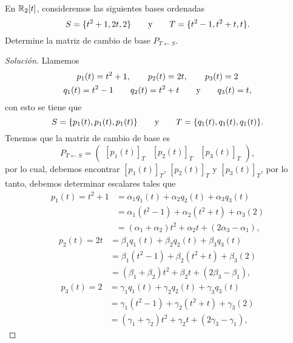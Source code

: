 \documentclass[a4,11pt]{aleph-notas}
\begin{document}
\begin{ejer}
    En $\mathbb{R}_2[t]$, consideremos las siguientes bases ordenadas
    \[
        S = \{t^2+1,2t,2\}
        \qquad\text{y}\qquad
        T = \{t^2-1,t^2+t,t\}.
    \]
    Determine la matriz de cambio de base $P_{T \leftarrow S}$.
\end{ejer}


\begin{proof}[Solución]
    Llamemos
    \begin{gather*}
        p_1(t) = t^2+1,\qquad
        p_2(t) = 2t,\qquad
        p_3(t) = 2\\
        q_1(t) = t^2-1\qquad
        q_2(t) = t^2+t\qquad\text{y}\qquad
        q_3(t) = t,
    \end{gather*}
    con esto se tiene que
    \[
        S = \{p_1(t),p_1(t),p_1(t)\}
        \qquad\text{y}\qquad
        T = \{q_1(t),q_1(t),q_1(t)\}.
    \]
    Tenemos que la matriz de cambio de base es 
    \[
        P_{T\leftarrow S} = 
        \begin{pmatrix}
        [p_1(t)]_T & [p_2(t)]_T & [p_3(t)]_T
        \end{pmatrix},
    \]
    por lo cual, debemos encontrar $[p_1(t)]_T$, $[p_2(t)]_T$ y $[p_3(t)]_T$, por lo tanto, debemos determinar escalares tales que
    \begin{align*}
        p_1(t) = t^2+1
        & = \alpha_1 q_1(t)+\alpha_2q_2(t)+\alpha_3q_3(t) \\
        & = \alpha_1 (t^2-1) +\alpha_2(t^2+t) +\alpha_3(2)\\
        & = (\alpha_1+\alpha_2)t^2+\alpha_2 t+(2\alpha_3-\alpha_1),
    \end{align*}
    \begin{align*}
        p_2(t) = 2t
        & = \beta_1 q_1(t)+\beta_2q_2(t)+\beta_3q_3(t) \\
        & = \beta_1 (t^2-1) +\beta_2(t^2+t) +\beta_3(2)\\
        & = (\beta_1+\beta_2)t^2+\beta_2 t+(2\beta_3-\beta_1),
    \end{align*}
    \begin{align*}
        p_3(t) = 2
        & = \gamma_1 q_1(t)+\gamma_2q_2(t)+\gamma_3q_3(t) \\
        & = \gamma_1 (t^2-1) +\gamma_2(t^2+t) +\gamma_3(2)\\
        & = (\gamma_1+\gamma_2)t^2+\gamma_2 t+(2\gamma_3-\gamma_1),
    \end{align*}

\end{proof}
\end{document}
